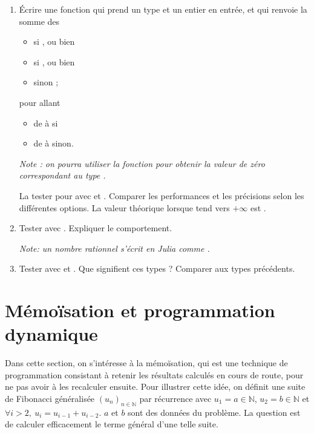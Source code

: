 \documentclass{article}
\newcommand{\seq}[3]{\ensuremath{\left(#1_{#2}\right)_{#2\in#3}}}
\newcommand{\N}{\mathbb{N}}
\begin{document}
\begin{enumerate}
	\item Écrire une fonction  qui prend un type  et un entier  en entrée, et qui renvoie la somme des \begin{itemize}
		\item {} si , ou bien
		\item {} si , ou bien
		\item {} sinon ;
	\end{itemize}
	pour  allant
	\begin{itemize}
		\item de  à  si 
		\item de  à  sinon.
	\end{itemize}
	
	\textsl{Note : on pourra utiliser la fonction  pour obtenir la valeur de zéro correspondant au type .}
	
	La tester pour  avec  et . Comparer les performances et les précisions selon les différentes options. La valeur théorique lorsque  tend vers $+\infty$ est .

	\item Tester avec . Expliquer le comportement.

	\textsl{Note: un nombre rationnel s'écrit en Julia comme .}

	\item Tester avec  et . Que signifient ces types ? Comparer aux types précédents.
\end{enumerate}


\section{Mémoïsation et programmation dynamique}

Dans cette section, on s'intéresse à la mémoïsation, qui est une technique de programmation consistant à retenir les résultats calculés en cours de route, pour ne pas avoir à les recalculer ensuite. Pour illustrer cette idée, on définit une suite de Fibonacci généralisée $\seq un\N$ par récurrence avec $u_1 = a\in\N$, $u_2 = b\in\N$ et $\forall i>2,\ u_i = u_{i-1} + u_{i-2}$. $a$ et $b$ sont des données du problème. La question est de calculer efficacement le terme général d'une telle suite.
\end{document}
